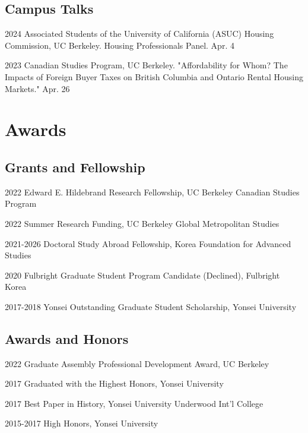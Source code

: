 \documentclass[12pt,letterpaper]{report}
\begin{document}
    \subsection*{Campus Talks}
    \begin{tablist}
        \item[2024] \tab{} Associated Students of the University of California (ASUC) Housing Commission, UC Berkeley. Housing Professionals Panel. Apr. 4
        \item[2023] \tab{} Canadian Studies Program, UC Berkeley. "Affordability for Whom? The Impacts of Foreign Buyer Taxes on British Columbia and Ontario Rental Housing Markets." Apr. 26
    \end{tablist}


\section*{Awards}
    \subsection*{Grants and Fellowship}
    \begin{tablist}
        \item[2022] \tab{}Edward E. Hildebrand Research Fellowship, UC Berkeley Canadian Studies Program
        \item[2022] \tab{}Summer Research Funding, UC Berkeley Global Metropolitan Studies
        \item[2021-2026] \tab{}Doctoral Study Abroad Fellowship, Korea Foundation for Advanced Studies
        \item[2020] \tab{}Fulbright Graduate Student Program Candidate (Declined), Fulbright Korea
        \item[2017-2018] \tab{}Yonsei Outstanding Graduate Student Scholarship, Yonsei University
    \end{tablist}
    \subsection*{Awards and Honors}
    \begin{tablist}
        \item[2022] \tab{}Graduate Assembly Professional Development Award, UC Berkeley
        \item[2017] \tab{}Graduated with the Highest Honors, Yonsei University
        \item[2017] \tab{}Best Paper in History, Yonsei University Underwood Int'l College
        \item[2015-2017] \tab{}High Honors, Yonsei University
    \end{tablist}
\end{document}
